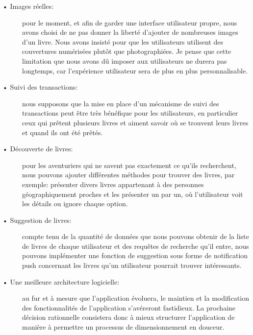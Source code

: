 \begin{description}

\item[• Images réelles:] pour le moment, et afin de garder une interface utilisateur propre, nous avons choisi de ne pas donner la liberté d'ajouter de nombreuses images d'un livre. Nous avons insisté pour que les utilisateurs utilisent des couvertures numérisées plutôt que photographiées. Je pense que cette limitation que nous avons dû imposer aux utilisateurs ne durera pas longtemps, car l'expérience utilisateur sera de plus en plus personnalisable.

\item[• Suivi des transactions:] nous supposons que la mise en place d'un mécanisme de suivi des transactions peut être très bénéfique pour les utilisateurs, en particulier ceux qui prêtent plusieurs livres et aiment savoir où se trouvent leurs livres et quand ils ont été prêtés.

\item[• Découverte de livres:] pour les aventuriers qui ne savent pas exactement ce qu’ils recherchent, nous pouvons ajouter différentes méthodes pour trouver des livres, par exemple: présenter divers livres appartenant à des personnes géographiquement proches et les présenter un par un, où l'utilisateur voit les détails ou ignore chaque option.

\item[• Suggestion de livres:] compte tenu de la quantité de données que nous pouvons obtenir de la liste de livres de chaque utilisateur et des requêtes de recherche qu’il entre, nous pouvons implémenter une fonction de suggestion sous forme de notification push concernant les livres qu’un utilisateur pourrait trouver intéressants.

\item[• Une meilleure architecture logicielle:] au fur et à mesure que l'application évoluera, le maintien et la modification des fonctionnalités de l'application s'avéreront fastidieux. La prochaine décision rationnelle consistera donc à mieux structurer l'application de manière à permettre un processus de dimensionnement en douceur.

\end{description}
